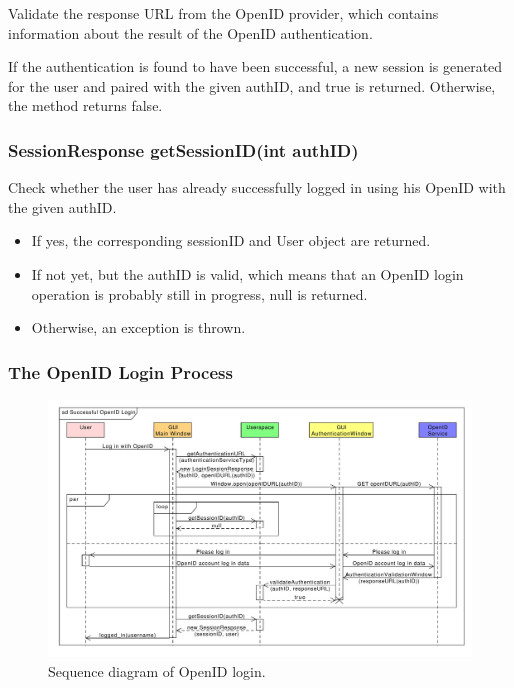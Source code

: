Validate the response URL from the OpenID provider, which contains information about the result of the OpenID authentication.

If the authentication is found to have been successful, a new session is generated for the user and paired with the given authID, and true is returned.
Otherwise, the method returns false.

\subsubsection{SessionResponse getSessionID(int authID)}

Check whether the user has already successfully logged in using his OpenID with the given authID.

\begin{itemize}
\item If yes, the corresponding sessionID and User object are returned.
\item If not yet, but the authID is valid, which means that an OpenID login operation is probably still in progress, null is returned.
\item Otherwise, an exception is thrown.
\end{itemize}

\subsubsection{The OpenID Login Process}

\begin{figure}[h]
\begin{center}
\includegraphics[scale=0.55, angle=90]{figures/openid_login_sequence.pdf}
\end{center}
\caption{Sequence diagram of OpenID login.}\label{rpc:sd:openid_login}
\end{figure}

